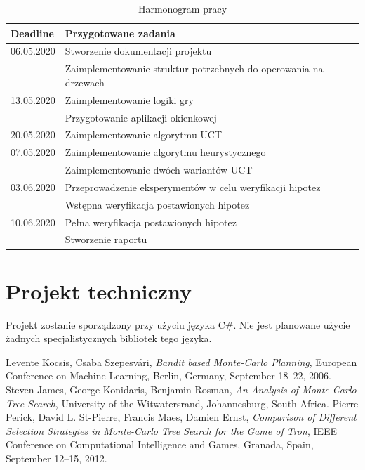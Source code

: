 \documentclass[a4paper,12pt]{article}
\let\oldsection\section
\renewcommand\section{\clearpage\oldsection}
\begin{document}
\begin{table}[h!]
	\centering
	\caption{Harmonogram pracy}
	\label{tab:schedule}
	\smallskip
	\begin{tabular}{|l|l|}
		\hline
		\textbf{Deadline}   & \textbf{Przygotowane zadania} \\ \hline
		
		06.05.2020 	& Stworzenie dokumentacji projektu \\ 
		& Zaimplementowanie struktur potrzebnych do operowania na drzewach \\ \hline
		
		13.05.2020  & Zaimplementowanie logiki gry \\
		& Przygotowanie aplikacji okienkowej \\ \hline
		
		20.05.2020	& Zaimplementowanie algorytmu UCT  \\ \hline
		
		07.05.2020	&  Zaimplementowanie algorytmu heurystycznego \\ 
		& Zaimplementowanie dwóch wariantów UCT \\ \hline
		
		03.06.2020	& Przeprowadzenie eksperymentów w celu weryfikacji hipotez \\ 
		&  Wstępna weryfikacja postawionych hipotez \\ \hline
		
		10.06.2020	& Pełna weryfikacja postawionych hipotez \\ 
		& Stworzenie raportu \\ \hline
	\end{tabular}
\end{table}


\section{Projekt techniczny}
Projekt zostanie sporządzony przy użyciu języka C\#. Nie jest planowane użycie żadnych specjalistycznych bibliotek tego języka.

\begin{thebibliography}{20}
	 Levente Kocsis, Csaba Szepesvári, \emph{Bandit based Monte-Carlo Planning}, European Conference on Machine Learning, Berlin, Germany, September 18--22, 2006.
	 Steven James, George Konidaris, Benjamin Rosman, \emph{An Analysis of Monte Carlo Tree Search}, University of the Witwatersrand, Johannesburg, South Africa.
	 Pierre Perick, David L. St-Pierre, Francis Maes, Damien Ernst, \emph{Comparison of Different Selection Strategies in Monte-Carlo Tree Search for the Game of Tron},  IEEE Conference on Computational Intelligence and Games, Granada, Spain, September 12--15, 2012.
\end{thebibliography}
\end{document}
